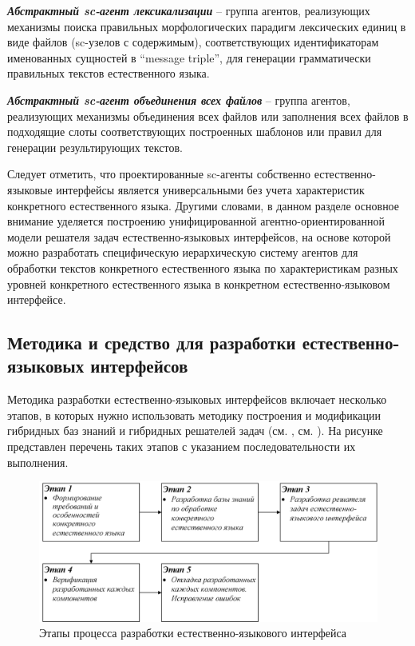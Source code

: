 \textit{\textbf{Абстрактный sc-агент лексикализации}} -- группа агентов, реализующих механизмы поиска правильных морфологических парадигм лексических единиц в виде файлов (sc-узелов с содержимым), соответствующих идентификаторам именованных сущностей в ``message triple'', для генерации грамматически правильных текстов естественного языка.

\textit{\textbf{Абстрактный sc-агент объединения всех файлов}} -- группа агентов, реализующих механизмы объединения всех файлов или заполнения всех файлов в подходящие слоты соответствующих построенных шаблонов или правил для генерации результирующих текстов. 

Следует отметить, что проектированные sc-агенты собственно естественно-языковые интерфейсы является универсальными без учета характеристик конкретного естественного языка. Другими словами, в данном разделе основное внимание уделяется построению унифицированной агентно-ориентированной модели решателя задач естественно-языковых интерфейсов, на основе которой можно разработать специфическую иерархическую систему агентов для обработки текстов конкретного естественного языка по характеристикам разных уровней конкретного естественного языка в конкретном естественно-языковом интерфейсе.

\subsection{Методика и средство для разработки естественно-языковых интерфейсов}
Методика разработки естественно-языковых интерфейсов включает несколько этапов, в которых нужно использовать методику построения и модификации гибридных баз знаний и гибридных решателей задач (см. , см. ). На рисунке \textit{} представлен перечень таких этапов с указанием последовательности их выполнения.
\begin{figure}[H]
	\centering
	\includegraphics[scale=0.8,width=1.0\textwidth]{images/part4/chapter_chinese/method.png}
	\caption{Этапы процесса разработки естественно-языкового интерфейса}
	\label{fig:method-interface}
\end{figure}

